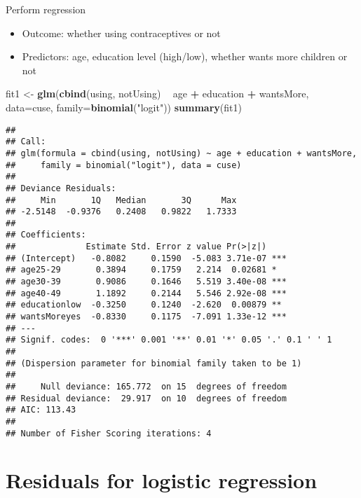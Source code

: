 \documentclass[
  ignorenonframetext,
]{beamer}
\newenvironment{Shaded}{\begin{snugshade}}{\end{snugshade}}
\newcommand{\DataTypeTok}[1]{\textcolor[rgb]{0.13,0.29,0.53}{#1}}
\newcommand{\KeywordTok}[1]{\textcolor[rgb]{0.13,0.29,0.53}{\textbf{#1}}}
\newcommand{\NormalTok}[1]{#1}
\newcommand{\OperatorTok}[1]{\textcolor[rgb]{0.81,0.36,0.00}{\textbf{#1}}}
\newcommand{\StringTok}[1]{\textcolor[rgb]{0.31,0.60,0.02}{#1}}
\providecommand{\tightlist}{%
  \setlength{\itemsep}{0pt}\setlength{\parskip}{0pt}}
\begin{document}
\begin{frame}[fragile]{Perform regression}
\protect\hypertarget{perform-regression}{}

\begin{itemize}
\tightlist
\item
  Outcome: whether using contraceptives or not
\item
  Predictors: age, education level (high/low), whether wants more
  children or not
\end{itemize}

\tiny

\begin{Shaded}
\begin{Highlighting}[]
\NormalTok{fit1 <-}\StringTok{ }\KeywordTok{glm}\NormalTok{(}\KeywordTok{cbind}\NormalTok{(using, notUsing) }\OperatorTok{~}\StringTok{ }\NormalTok{age }\OperatorTok{+}\StringTok{ }\NormalTok{education }\OperatorTok{+}\StringTok{ }\NormalTok{wantsMore, }
           \DataTypeTok{data=}\NormalTok{cuse, }\DataTypeTok{family=}\KeywordTok{binomial}\NormalTok{(}\StringTok{"logit"}\NormalTok{))}
\KeywordTok{summary}\NormalTok{(fit1)}
\end{Highlighting}
\end{Shaded}

\begin{verbatim}
## 
## Call:
## glm(formula = cbind(using, notUsing) ~ age + education + wantsMore, 
##     family = binomial("logit"), data = cuse)
## 
## Deviance Residuals: 
##     Min       1Q   Median       3Q      Max  
## -2.5148  -0.9376   0.2408   0.9822   1.7333  
## 
## Coefficients:
##              Estimate Std. Error z value Pr(>|z|)    
## (Intercept)   -0.8082     0.1590  -5.083 3.71e-07 ***
## age25-29       0.3894     0.1759   2.214  0.02681 *  
## age30-39       0.9086     0.1646   5.519 3.40e-08 ***
## age40-49       1.1892     0.2144   5.546 2.92e-08 ***
## educationlow  -0.3250     0.1240  -2.620  0.00879 ** 
## wantsMoreyes  -0.8330     0.1175  -7.091 1.33e-12 ***
## ---
## Signif. codes:  0 '***' 0.001 '**' 0.01 '*' 0.05 '.' 0.1 ' ' 1
## 
## (Dispersion parameter for binomial family taken to be 1)
## 
##     Null deviance: 165.772  on 15  degrees of freedom
## Residual deviance:  29.917  on 10  degrees of freedom
## AIC: 113.43
## 
## Number of Fisher Scoring iterations: 4
\end{verbatim}

\end{frame}

\hypertarget{residuals-for-logistic-regression}{%
\section{Residuals for logistic
regression}\label{residuals-for-logistic-regression}}
\end{document}
